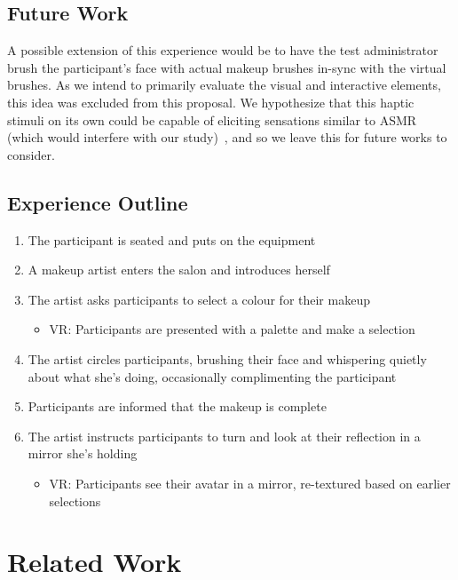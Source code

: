 \documentclass{sigchi}
\begin{document}
\subsection{Future Work}

A possible extension of this experience would be to have the test administrator brush the participant's face with actual makeup brushes in-sync with the virtual brushes. As we intend to primarily evaluate the visual and interactive elements, this idea was excluded from this proposal. We hypothesize that this haptic stimuli on its own could be capable of eliciting sensations similar to ASMR (which would interfere with our study)~\cite{hall1897psychology}, and so we leave this for future works to consider.

\subsection{Experience Outline}

\begin{enumerate}
\item{The participant is seated and puts on the equipment}
\item{A makeup artist enters the salon and introduces herself}
\item{The artist asks participants to select a colour for their makeup}
\begin{itemize}
\item{VR: Participants are presented with a palette and make a selection}
\end{itemize}
\item{The artist circles participants, brushing their face and whispering quietly about what she's doing, occasionally complimenting the participant}
\item{Participants are informed that the makeup is complete }
\item{The artist instructs participants to turn and look at their reflection in a mirror she's holding}
\begin{itemize}
\item{VR: Participants see their avatar in a mirror, re-textured based on earlier selections}
\end{itemize}
\end{enumerate}

\section{Related Work}
\end{document}
